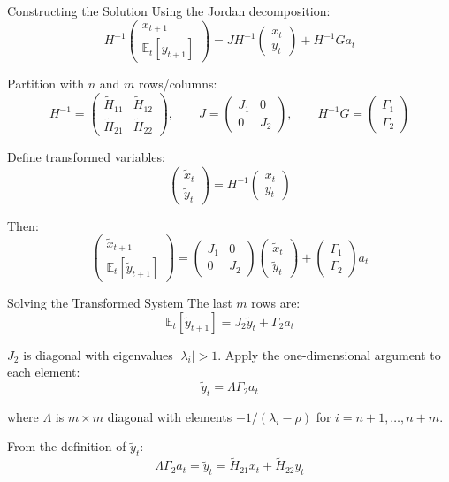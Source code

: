\documentclass[blue]{beamer}
\newcommand{\E}{\mathbb{E}}
\begin{document}
\begin{frame}{Constructing the Solution}
	Using the Jordan decomposition:
	\[
	H^{-1} \begin{pmatrix} x_{t+1} \\ \E_t[y_{t+1}] \end{pmatrix} = J H^{-1} \begin{pmatrix} x_t \\ y_t \end{pmatrix} + H^{-1} G a_t
	\]

	Partition with $n$ and $m$ rows/columns:
	\[
	H^{-1} = \begin{pmatrix} \tilde{H}_{11} & \tilde{H}_{12} \\ \tilde{H}_{21} & \tilde{H}_{22} \end{pmatrix}, \qquad J = \begin{pmatrix} J_1 & 0 \\ 0 & J_2 \end{pmatrix}, \qquad H^{-1} G = \begin{pmatrix} \Gamma_1 \\ \Gamma_2 \end{pmatrix}
	\]

	Define transformed variables:
	\[
	\begin{pmatrix} \tilde{x}_t \\ \tilde{y}_t \end{pmatrix} = H^{-1} \begin{pmatrix} x_t \\ y_t \end{pmatrix}
	\]
	
	Then:
	\[
	\begin{pmatrix} \tilde{x}_{t+1} \\ \E_t[\tilde{y}_{t+1}] \end{pmatrix} = \begin{pmatrix} J_1 & 0 \\ 0 & J_2 \end{pmatrix} \begin{pmatrix} \tilde{x}_t \\ \tilde{y}_t \end{pmatrix} + \begin{pmatrix} \Gamma_1 \\ \Gamma_2 \end{pmatrix} a_t
	\]
\end{frame}

\begin{frame}{Solving the Transformed System}
	The last $m$ rows are:
	\[
	\E_t[\tilde{y}_{t+1}] = J_2 \tilde{y}_t + \Gamma_2 a_t
	\]
	
	\bigskip
	$J_2$ is diagonal with eigenvalues $|\lambda_i| > 1$. Apply the one-dimensional argument to each element:
	\[
	\tilde{y}_t = \Lambda \Gamma_2 a_t
	\]
	
	where $\Lambda$ is $m \times m$ diagonal with elements $-1/(\lambda_i - \rho)$ for $i = n+1, \ldots, n+m$.
	
	\bigskip
	From the definition of $\tilde{y}_t$:
	\[
	\Lambda \Gamma_2 a_t = \tilde{y}_t=\tilde{H}_{21} x_t + \tilde{H}_{22} y_t
	\]
\end{frame}
\end{document}
